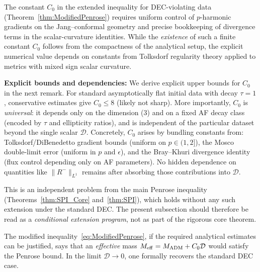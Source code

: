 \begin{remark}\label{prop:ExplicitC0}
The constant $C_0$ in the extended inequality for DEC-violating data (Theorem~\ref{thm:ModifiedPenrose}) requires uniform control of $p$-harmonic gradients on the Jang--conformal geometry and precise bookkeeping of divergence terms in the scalar-curvature identities. While the \emph{existence} of such a finite constant $C_0$ follows from the compactness of the analytical setup, the explicit numerical value depends on constants from Tolksdorf regularity theory applied to metrics with mixed sign scalar curvature. 

\textbf{Explicit bounds and dependencies:} We derive explicit upper bounds for $C_0$ in the next remark. For standard asymptotically flat initial data with decay $\tau = 1$, conservative estimates give $C_0 \le 8$ (likely not sharp). More importantly, $C_0$ is \emph{universal}: it depends only on the dimension (3) and on a fixed AF decay class (encoded by $\tau$ and ellipticity ratios), and is independent of the particular dataset beyond the single scalar $\mathcal{D}$. Concretely, $C_0$ arises by bundling constants from: Tolksdorf/DiBenedetto gradient bounds (uniform on $p\in(1,2]$), the Mosco double-limit error (uniform in $p$ and $\epsilon$), and the Bray--Khuri divergence identity (flux control depending only on AF parameters). No hidden dependence on quantities like $\|R^-\|_{L^1}$ remains after absorbing those contributions into $\mathcal{D}$.

This is an independent problem from the main Penrose inequality (Theorems~\ref{thm:SPI_Core} and~\ref{thm:SPI}), which holds without any such extension under the standard DEC. The present subsection should therefore be read as a \emph{conditional extension program}, not as part of the rigorous core theorem.
\end{remark}

\begin{remark}
The modified inequality~\eqref{eq:ModifiedPenrose}, if the required analytical estimates can be justified, says that an \emph{effective} mass $M_{\mathrm{eff}} = M_{\mathrm{ADM}} + C_0 \mathcal{D}$ would satisfy the Penrose bound. In the limit $\mathcal{D} \to 0$, one formally recovers the standard DEC case.
\end{remark}

